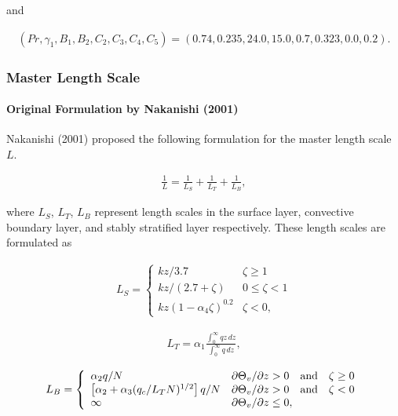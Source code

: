 and

\begin{eqnarray}
(Pr,\gamma_1,B_1,B_2,C_2,C_3,C_4,C_5)=(0.74,0.235,24.0,15.0,0.7,0.323,0.0,0.2).
\end{eqnarray}

\hypertarget{master-length-scale}{%
\subsubsection{Master Length Scale}\label{master-length-scale}}

\hypertarget{original-formulation-by-nakanishi-2001}{%
\paragraph{Original Formulation by Nakanishi (2001)}\label{original-formulation-by-nakanishi-2001}}

Nakanishi (2001) proposed the following formulation for the master length scale \(L\).

\begin{eqnarray}\frac{1}{L}=\frac{1}{L_S}+\frac{1}{L_T}+\frac{1}{L_B} \label{p-dif.1}, \end{eqnarray}

where \(L_S\), \(L_T\), \(L_B\) represent length scales in the surface layer, convective boundary layer, and stably stratified layer respectively. These length scales are formulated as

\begin{eqnarray}
L_S=\left\{
    \begin{array}{lr}
      kz/3.7 &\zeta\ge 1\\
      kz/(2.7+\zeta) &0\le\zeta< 1\\
      kz(1-\alpha_4\zeta)^{0.2} &\zeta< 0,
    \end{array}
  \right.
\end{eqnarray}

\begin{eqnarray}L_T=\alpha_1\frac{\displaystyle \int_0^\infty{qz}\,dz}{\displaystyle \int_0^\infty{q}\,dz},\end{eqnarray}

\begin{eqnarray}
L_B=\left\{
    \begin{array}{ll}
      \alpha_2 q/N &\partial\Theta_v/\partial z> 0 \quad\rm{and}\quad\zeta\ge 0\\
      \left[\alpha_2+\alpha_3(q_c/L_TN)^{1/2}\right]q/N &\partial\Theta_v/\partial z> 0 \quad\rm{and}\quad\zeta< 0\\
      \infty &\partial\Theta_v/\partial z\le 0,
    \end{array}
  \right.
\end{eqnarray}

